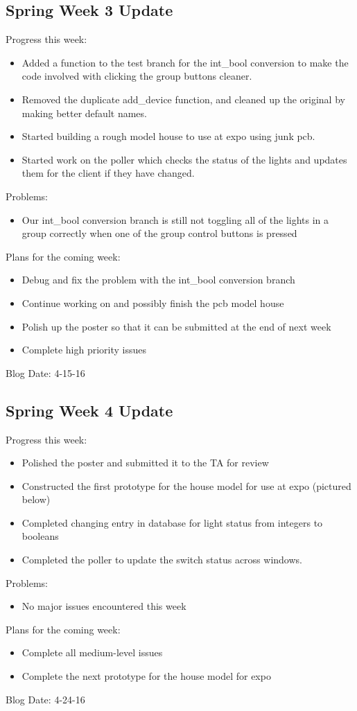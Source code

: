 \subsection{Spring Week 3 Update}
Progress this week:
\begin{itemize}
   \item Added a function to the test branch for the int\_bool conversion to make the code involved with clicking the group buttons cleaner.
   \item Removed the duplicate add\_device function, and cleaned up the original by making better default names.
   \item Started building a rough model house to use at expo using junk pcb.
   \item Started work on the poller which checks the status of the lights and updates them for the client if they have changed.
\end{itemize}
Problems:
\begin{itemize}
   \item Our int\_bool conversion branch is still not toggling all of the lights in a group correctly when one of the group control buttons is pressed
\end{itemize}
Plans for the coming week:
\begin{itemize}
   \item Debug and fix the problem with the int\_bool conversion branch
   \item Continue working on and possibly finish the pcb model house
   \item Polish up the poster so that it can be submitted at the end of next week
   \item Complete high priority issues
\end{itemize}
Blog Date: 4-15-16

\subsection{Spring Week 4 Update}
Progress this week:
\begin{itemize}
   \item Polished the poster and submitted it to the TA for review
   \item Constructed the first prototype for the house model for use at expo (pictured below)
   \item Completed changing entry in database for light status from integers to booleans
   \item Completed the poller to update the switch status across windows.
\end{itemize}
Problems:
\begin{itemize}
   \item No major issues encountered this week
\end{itemize}
Plans for the coming week:
\begin{itemize}
   \item Complete all medium-level issues
   \item Complete the next prototype for the house model for expo
\end{itemize}
Blog Date: 4-24-16

